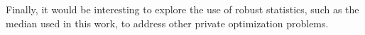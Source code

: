 Finally, it would be interesting to explore the use of robust statistics, such as the median used in this work, to address other private optimization problems.








